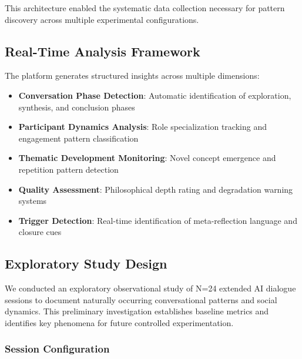 \documentclass[11pt,letterpaper]{article}
\newcommand{\exponedataTotalSessionsRaw}{24}
\newcommand{\exponedataTotalSessions}{N=\exponedataTotalSessionsRaw}
\begin{document}
This architecture enabled the systematic data collection necessary for pattern discovery across multiple experimental configurations.

\subsection{Real-Time Analysis Framework}

The platform generates structured insights across multiple dimensions:

\begin{itemize}
    \item \textbf{Conversation Phase Detection}: Automatic identification of exploration, synthesis, and conclusion phases
    \item \textbf{Participant Dynamics Analysis}: Role specialization tracking and engagement pattern classification
    \item \textbf{Thematic Development Monitoring}: Novel concept emergence and repetition pattern detection
    \item \textbf{Quality Assessment}: Philosophical depth rating and degradation warning systems
    \item \textbf{Trigger Detection}: Real-time identification of meta-reflection language and closure cues
\end{itemize}

\subsection{Exploratory Study Design}

We conducted an exploratory observational study of \exponedataTotalSessions{} extended AI dialogue sessions to document naturally occurring conversational patterns and social dynamics. This preliminary investigation establishes baseline metrics and identifies key phenomena for future controlled experimentation.

\subsubsection{Session Configuration}
\end{document}
